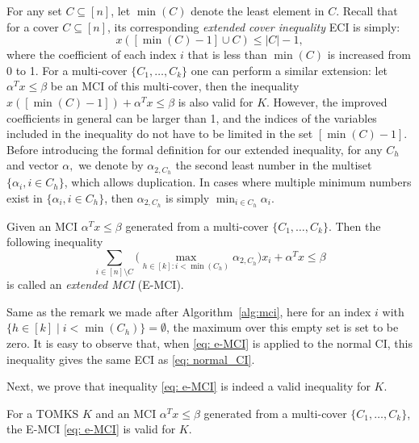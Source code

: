 For any set $C \subseteq [n]$, let $\min(C)$ denote the least element in $C$.
Recall that for a cover $C \subseteq [n]$, its corresponding \emph{extended cover inequality} ECI is simply:
\begin{equation}
\label{eq: normal_CI}
x([\min(C)-1] \cup C) \leq |C| - 1,
\end{equation}
where the coefficient of each index $i$ that is less than $\min(C)$ is increased from 0 to 1. 
For a multi-cover $\{C_1, \ldots, C_k\}$ one can perform a similar extension: let $\alpha^T x \leq \beta$ be an MCI of this multi-cover, then the inequality $x([\min(C) - 1]) + \alpha^T x \leq \beta$ is also valid for $K$. 
However, the improved coefficients in general can be larger than 1, and the indices of the variables included in the inequality do not have to be limited in the set $[\min(C) - 1]$. 
Before introducing the formal definition for our extended inequality, for any $C_h$ and vector $\alpha,$ we denote by $\alpha_{2, C_h}$ the second least number in the multiset $\{\alpha_i, i \in C_h\}$, which allows duplication. 
In cases where multiple minimum numbers exist in $\{\alpha_i, i \in C_h\}$, then $\alpha_{2, C_h}$ is simply $\min_{i \in C_h} \alpha_i$. 

\begin{definition}
Given an MCI $\alpha^T x \leq \beta$ generated from a multi-cover $\{C_1, \ldots, C_k\}$. Then the following inequality
\begin{equation}
\label{eq: e-MCI}
\sum_{i \in [n] \setminus C} \big(\max_{h \in [k]: i < \min(C_h)} \alpha_{2, C_h} \big)  x_i + \alpha^T x \leq \beta
\end{equation}
is called an \emph{extended MCI} (E-MCI).
\end{definition}
Same as the remark we made after Algorithm~\ref{alg:mci}, here for an index $i$ with $\{h \in [k] \mid i < \min(C_h)\} = \emptyset$, the maximum over this empty set is set to be zero. 
It is easy to observe that, when \eqref{eq: e-MCI} is applied to the normal CI, this inequality  gives the same ECI as \eqref{eq: normal_CI}. 

Next, we prove that inequality \eqref{eq: e-MCI} is indeed a valid inequality for $K$.
\begin{theorem}
For a TOMKS $K$ and an MCI $\alpha^T x \leq \beta$ generated from a multi-cover $\{C_1, \ldots, C_k\}$, the E-MCI \eqref{eq: e-MCI} is valid for $K$. 
\end{theorem}

